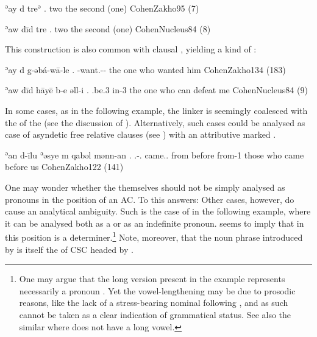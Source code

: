 {ʾay \zero{} d\cb{} treʾ}
{.\fem{} \zero{} \lnk\cb{} two}
{the second (one\textsubscript{\fem})}
{CohenZakho}{95 (7)}

{ʾaw \zero{} dīd tre}
{.\masc{} \zero{} \lnkd{} two}
{the second (one\textsubscript{\masc})}
{CohenNucleus}{84 (8)}

This construction is also common with clausal \secns, yielding a kind of :

{ʾay \zero{} d\cb{} g-əbá-wā-le}
{.\fem{} \zero{} \lnk\cb{} \ind-want.\fem-\pst-\masc}
{the one\textsubscript{\fem} who wanted him}
{CohenZakho}{134 (183)}

{ʾaw \zero{} dīd hāyē \cb{}b-e əll-i}
{.\masc{} \zero{} \lnkd{} \sbjv.be.3\masc{} \cb{}in-3\masc{} \sg}
{the one\textsubscript{\masc} who can defeat me}
{CohenNucleus}{84 (9)}

In some cases, as in the following example, the linker is seemingly coalesced with the  of the  (see the discussion of ). Alternatively, such cases could be analysed as case of asyndetic free relative clauses (see ) with an attributive marked . 

{ʾan \zero{} d-īlu ʾəsye m\cb{} qabəl mənn-an}
{.\pl{} \zero{} \opt\lnk.\gen-\cop.\pl{} came.\resl.\pl{} from\cb{} before from-1\pl}
{those who came before us}
{CohenZakho}{122 (141)}

One may wonder whether the  themselves should not be simply analysed as pronouns in the \prim position of an AC. To this \citet[134]{CohenZakho} answers:  Other cases, however, do cause an analytical ambiguity. Such is the case of  in the following example, where it can be analysed both as a  or as an indefinite pronoun.  \citet[111f.]{CohenZakho} seems to imply that  in this position is a determiner.\footnote{One may argue that the long version \phonetic[xā] present in the example represents necessarily a pronoun \citep[cf.][191]{SabarDictionary}. Yet  the vowel-lengthening may be due to prosodic reasons, like the lack of a stress-bearing nominal following , and as such cannot be taken as a clear indication of grammatical status. See also the similar  where  does not have a long vowel.}  Note, moreover, that the noun phrase introduced by  is itself the \secn of CSC headed by .

